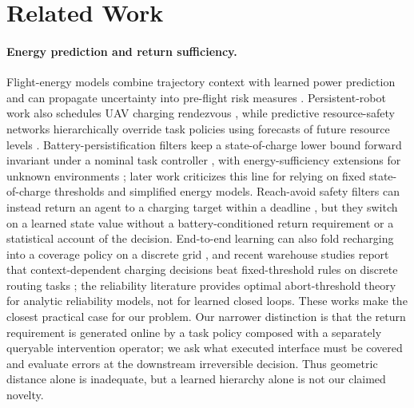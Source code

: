 \section{Related Work}
\label{sec:related}

\paragraph{Energy prediction and return sufficiency.}
Flight-energy models combine trajectory context with learned power prediction and can propagate uncertainty into pre-flight risk measures \citep{choudhry2021cvar}. Persistent-robot work also schedules UAV charging rendezvous \citep{mathew2015rendezvous}, while predictive resource-safety networks hierarchically override task policies using forecasts of future resource levels \citep{guo2020predictive}. Battery-persistification filters keep a state-of-charge lower bound forward invariant under a nominal task controller \citep{notomista2018persistification}, with energy-sufficiency extensions for unknown environments \citep{fouad2023energysufficiency}; later work criticizes this line for relying on fixed state-of-charge thresholds and simplified energy models. Reach-avoid safety filters can instead return an agent to a charging target within a deadline \citep{begzadic2025backtobase}, but they switch on a learned state value without a battery-conditioned return requirement or a statistical account of the decision. End-to-end learning can also fold recharging into a coverage policy on a discrete grid \citep{theile2023recharge}, and recent warehouse studies report that context-dependent charging decisions beat fixed-threshold rules on discrete routing tasks \citep{shaji2026orderpickers}; the reliability literature provides optimal abort-threshold theory for analytic reliability models, not for learned closed loops. These works make the closest practical case for our problem. Our narrower distinction is that the return requirement is generated online by a task policy composed with a separately queryable intervention operator; we ask what executed interface must be covered and evaluate errors at the downstream irreversible decision. Thus geometric distance alone is inadequate, but a learned hierarchy alone is not our claimed novelty.

